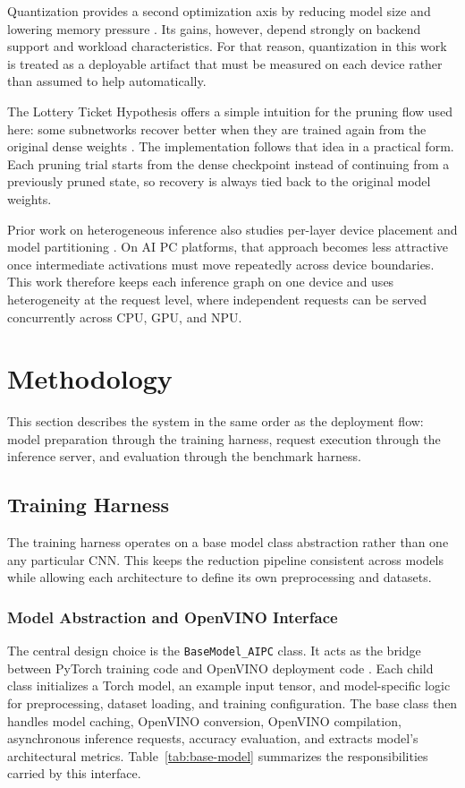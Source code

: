 \documentclass[conference]{IEEEtran}
\begin{document}
Quantization provides a second optimization axis by reducing model size and lowering memory pressure \cite{jacob2018quantization,krishnamoorthi2018quantizing}. Its gains, however, depend strongly on backend support and workload characteristics. For that reason, quantization in this work is treated as a deployable artifact that must be measured on each device rather than assumed to help automatically.

The Lottery Ticket Hypothesis offers a simple intuition for the pruning flow used here: some subnetworks recover better when they are trained again from the original dense weights \cite{frankle2019lottery}. The implementation follows that idea in a practical form. Each pruning trial starts from the dense checkpoint instead of continuing from a previously pruned state, so recovery is always tied back to the original model weights.

Prior work on heterogeneous inference also studies per-layer device placement and model partitioning \cite{eshratifar2021jointdnn,eshratifar2019bottlenet}. On AI PC platforms, that approach becomes less attractive once intermediate activations must move repeatedly across device boundaries. This work therefore keeps each inference graph on one device and uses heterogeneity at the request level, where independent requests can be served concurrently across CPU, GPU, and NPU.

\section{Methodology}
This section describes the system in the same order as the deployment flow: model preparation through the training harness, request execution through the inference server, and evaluation through the benchmark harness.

\subsection{Training Harness}
The training harness operates on a base model class abstraction rather than one any particular CNN. This keeps the reduction pipeline consistent across models while allowing each architecture to define its own preprocessing and datasets.

\subsubsection{Model Abstraction and OpenVINO Interface}
The central design choice is the \texttt{BaseModel\_AIPC} class. It acts as the bridge between PyTorch training code and OpenVINO deployment code \cite{demidovskij2019openvino}. Each child class initializes a Torch model, an example input tensor, and model-specific logic for preprocessing, dataset loading, and training configuration. The base class then handles model caching, OpenVINO conversion, OpenVINO compilation, asynchronous inference requests, accuracy evaluation, and extracts model's architectural metrics. Table~\ref{tab:base-model} summarizes the responsibilities carried by this interface.
\end{document}
